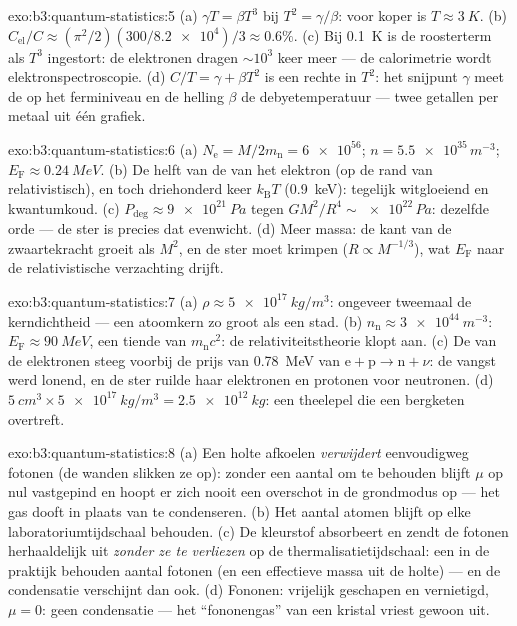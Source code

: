 \begin{solution}{exo:b3:quantum-statistics:5}
(a) $\gamma T = \beta T^3$ bij $T^2 = \gamma/\beta$: voor koper is
$T \approx \qty{3}{K}$. (b) $C_{\text{el}}/C \approx
(\pi^2/2)(300/\num{8.2e4})/3 \approx 0.6\%$. (c) Bij \qty{0.1}{K} is de
roosterterm als $T^3$ ingestort: de elektronen dragen $\sim10^3$ keer
meer --- de calorimetrie wordt elektronspectroscopie. (d) $C/T = \gamma + \beta T^2$ is een rechte in $T^2$: het snijpunt $\gamma$ meet de
 op het ferminiveau en de helling $\beta$ de
debyetemperatuur --- twee getallen per metaal uit één grafiek.
\end{solution}

\begin{solution}{exo:b3:quantum-statistics:6}
(a) $N_{\text{e}} = M/2m_{\text{n}} = \num{6e56}$; $n =
\num{5.5e35}\,\unit{m^{-3}}$; $E_{\text{F}} \approx
\qty{0.24}{MeV}$. (b)
De helft van de  van het elektron (op de rand van
relativistisch), en toch driehonderd keer $k_{\text{B}}T$
(\qty{0.9}{keV}): tegelijk witgloeiend en kwantumkoud. (c)
$P_{\text{deg}} \approx \qty{9e21}{Pa}$ tegen $GM^2/R^4 \sim
\num{e22}\,\unit{Pa}$: dezelfde orde --- de ster is precies dat
evenwicht. (d) Meer massa: de kant van de zwaartekracht groeit als $M^2$,
en de ster moet krimpen ($R \propto M^{-1/3}$), wat $E_{\text{F}}$ naar de
relativistische verzachting drijft.
\end{solution}

\begin{solution}{exo:b3:quantum-statistics:7}
(a) $\rho \approx \qty{5e17}{kg/m^3}$: ongeveer tweemaal de
kerndichtheid --- een atoomkern zo groot als een stad. (b) $n_{\text{n}}
\approx \qty{3e44}{m^{-3}}$: $E_{\text{F}} \approx \qty{90}{MeV}$, een
tiende van $m_{\text{n}}c^2$: de relativiteitstheorie klopt aan. (c) De
 van de elektronen steeg voorbij de prijs van
\qty{0.78}{MeV} van $\text{e} + \text{p} \to \text{n} + \nu$: de vangst
werd lonend, en de ster ruilde haar elektronen en protonen voor
neutronen. (d) $\qty{5}{cm^3} \times \qty{5e17}{kg/m^3} =
\qty{2.5e12}{kg}$: een theelepel die een bergketen overtreft.
\end{solution}

\begin{solution}{exo:b3:quantum-statistics:8}
(a) Een holte afkoelen \emph{verwijdert} eenvoudigweg fotonen (de wanden
slikken ze op): zonder een aantal om te behouden blijft $\mu$ op nul
vastgepind en hoopt er zich nooit een overschot in de grondmodus op --- het
gas dooft in plaats van te condenseren. (b) Het aantal atomen blijft op
elke laboratoriumtijdschaal behouden. (c) De kleurstof absorbeert en
zendt de fotonen herhaaldelijk uit \emph{zonder ze te verliezen} op de
thermalisatietijdschaal: een in de praktijk behouden aantal fotonen (en een
effectieve massa uit de holte) --- en de condensatie verschijnt dan ook.
(d) Fononen: vrijelijk geschapen en vernietigd, $\mu = 0$: geen
condensatie --- het ``fononengas'' van een kristal vriest gewoon uit.
\end{solution}

